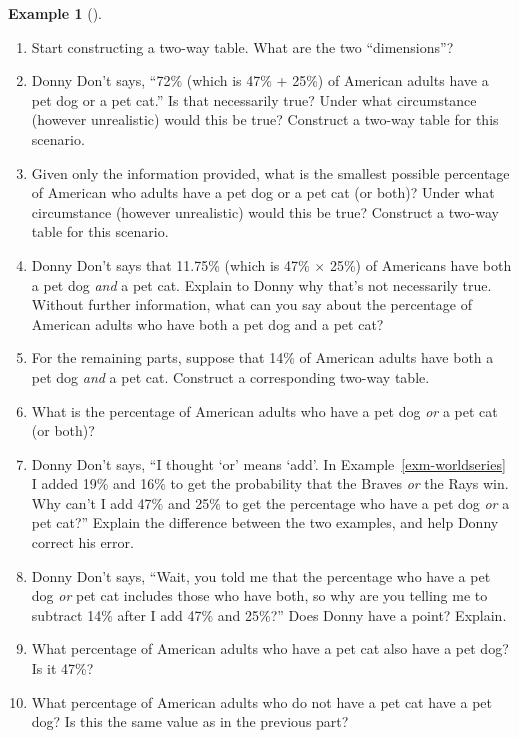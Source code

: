 \documentclass[
  letterpaper,
  DIV=11,
  numbers=noendperiod]{scrreprt}
\providecommand{\tightlist}{%
  \setlength{\itemsep}{0pt}\setlength{\parskip}{0pt}}
\theoremstyle{plain}
\theoremstyle{definition}
\newtheorem{example}{Example}[chapter]
\theoremstyle{definition}
\theoremstyle{definition}
\theoremstyle{remark}
\begin{document}
\begin{tcolorbox}[enhanced jigsaw, opacityback=0, left=2mm, colframe=quarto-callout-note-color-frame, toprule=.15mm, breakable, colback=white, leftrule=.75mm, arc=.35mm, rightrule=.15mm, bottomrule=.15mm]
\begin{example}[]
\begin{enumerate}
\def\labelenumi{\arabic{enumi}.}
\tightlist
\item
  Start constructing a two-way table. What are the two ``dimensions''?
\item
  Donny Don't says, ``72\% (which is 47\% + 25\%) of American adults
  have a pet dog or a pet cat.'' Is that necessarily true? Under what
  circumstance (however unrealistic) would this be true? Construct a
  two-way table for this scenario.
\item
  Given only the information provided, what is the smallest possible
  percentage of American who adults have a pet dog or a pet cat (or
  both)? Under what circumstance (however unrealistic) would this be
  true? Construct a two-way table for this scenario.
\item
  Donny Don't says that 11.75\% (which is 47\% \(\times\) 25\%) of
  Americans have both a pet dog \emph{and} a pet cat. Explain to Donny
  why that's not necessarily true. Without further information, what can
  you say about the percentage of American adults who have both a pet
  dog and a pet cat?
\item
  For the remaining parts, suppose that 14\% of American adults have
  both a pet dog \emph{and} a pet cat. Construct a corresponding two-way
  table.
\item
  What is the percentage of American adults who have a pet dog \emph{or}
  a pet cat (or both)?
\item
  Donny Don't says, ``I thought `or' means `add'. In
  Example~\ref{exm-worldseries} I added 19\% and 16\% to get the
  probability that the Braves \emph{or} the Rays win. Why can't I add
  47\% and 25\% to get the percentage who have a pet dog \emph{or} a pet
  cat?'' Explain the difference between the two examples, and help Donny
  correct his error.
\item
  Donny Don't says, ``Wait, you told me that the percentage who have a
  pet dog \emph{or} pet cat includes those who have both, so why are you
  telling me to subtract 14\% after I add 47\% and 25\%?'' Does Donny
  have a point? Explain.
\item
  What percentage of American adults who have a pet cat also have a pet
  dog? Is it 47\%?
\item
  What percentage of American adults who do not have a pet cat have a
  pet dog? Is this the same value as in the previous part?
\end{enumerate}

\end{example}

\end{tcolorbox}
\end{document}
